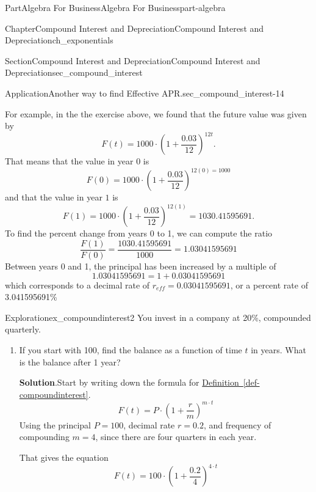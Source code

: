 \documentclass[oneside,10pt,]{tufte-book}
\newcommand{\blocktitlefont}{\relax}
\newcommand{\xreffont}{\relax}
\numberwithin{equation}{chapter}
\begin{document}
\begin{partptx}{Part}{Algebra For Business}{}{Algebra For Business}{}{}{part-algebra}
\begin{chapterptx}{Chapter}{Compound Interest and Depreciation}{}{Compound Interest and Depreciation}{}{}{ch_exponentials}
\begin{sectionptx}{Section}{Compound Interest and Depreciation}{}{Compound Interest and Depreciation}{}{}{sec_compound_interest}
\begin{insight}{Application}{Another way to find Effective APR.}{sec_compound_interest-14}
\par
For example, in the the exercise above, we found that the future value was given by%
\begin{equation*}
F(t) = 1000\cdot \left( 1 + \frac{0.03}{12}\right)^{12 t}\text{.}
\end{equation*}
That means that the value in year \(0\) is%
\begin{equation*}
F(0) = 1000\cdot \left( 1 + \frac{0.03}{12}\right)^{12 (0) = 1000}
\end{equation*}
and that the value in year \(1\) is%
\begin{equation*}
F(1) = 1000\cdot \left( 1 + \frac{0.03}{12}\right)^{12 (1)} = 1030.41595691\text{.}
\end{equation*}
To find the percent change from years 0 to 1, we can compute the ratio%
\begin{equation*}
\dfrac{F(1)}{F(0)} = \dfrac{1030.41595691}{1000} = 1.03041595691
\end{equation*}
Between years 0 and 1, the principal has been increased by a multiple of%
\begin{equation*}
1.03041595691 = 1 + 0.03041595691
\end{equation*}
which corresponds to a decimal rate of  \(r_{eff}=  0.03041595691\), or a percent rate of 3.041595691\%%
\end{insight}
\begin{exploration}{Exploration}{}{ex_compoundinterest2}%
You invest in a company at 20\%, compounded quarterly.%
\begin{enumerate}[font=\bfseries,label=(\alph*),ref=\alph*]%
\item{}If you start with \textdollar{}100, find the balance as a function of time \(t\) in years.  What is the balance after 1 year?%
\par\smallskip%
\noindent\textbf{\blocktitlefont Solution}.\hypertarget{ex_compoundinterest2-2-2}{}\quad{}Start by writing down the formula for  \hyperref[def-compoundinterest]{Definition~{\xreffont\ref{def-compoundinterest}}}.%
\begin{equation*}
F(t) = P \cdot \left(1 + \frac{r}{m}\right)^{m\cdot t}
\end{equation*}
Using the principal \(P=100\), decimal rate \(r=0.2\), and frequency of compounding \(m=4\), since there are four quarters in each year.%
\par
That gives the equation%
\begin{equation*}
F(t) = 100 \cdot \left(1 + \frac{0.2}{4}\right)^{4\cdot t}
\end{equation*}

\end{enumerate}
\end{exploration}
\end{sectionptx}
\end{chapterptx}
\end{partptx}
\end{document}
